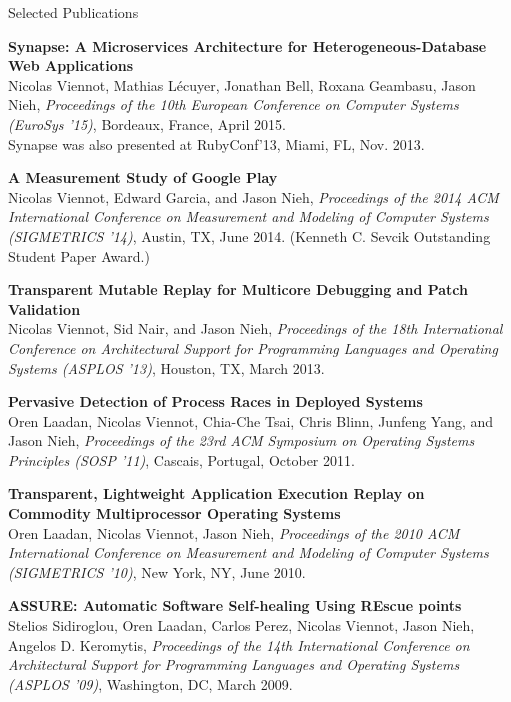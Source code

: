 \documentclass{resume} %
\begin{document}
\begin{rSection}{Selected Publications}
\begin{list}{.}{\leftmargin=0em}
\newenvironment{pub}[5]{ {\bf #1} \\ #2, {\em #3 (#4)}, #5}

\item \pub{Synapse: A Microservices Architecture for Heterogeneous-Database Web Applications}
{Nicolas Viennot, Mathias L\'{e}cuyer, Jonathan Bell, Roxana Geambasu, Jason Nieh}
{Proceedings of the 10th European Conference on Computer Systems}
{EuroSys '15}{Bordeaux, France, April 2015.}\\
Synapse was also presented at RubyConf'13, Miami, FL, Nov. 2013.

\item \pub{A Measurement Study of Google Play}
{Nicolas Viennot, Edward Garcia, and Jason Nieh}
{Proceedings of the 2014 ACM International Conference on Measurement and Modeling of Computer Systems}
{SIGMETRICS '14}{Austin, TX, June 2014. (Kenneth C. Sevcik Outstanding Student Paper Award.)}


\item \pub{Transparent Mutable Replay for Multicore Debugging and Patch Validation}
{Nicolas Viennot, Sid Nair, and Jason Nieh}
{Proceedings of the 18th International Conference on Architectural Support for Programming Languages and Operating Systems}
{ASPLOS '13}{Houston, TX, March 2013.}

\item \pub{Pervasive Detection of Process Races in Deployed Systems}
{Oren Laadan, Nicolas Viennot, Chia-Che Tsai, Chris Blinn, Junfeng Yang, and Jason Nieh}
{Proceedings of the 23rd ACM Symposium on Operating Systems Principles}
{SOSP '11}{Cascais, Portugal, October 2011.}

\item \pub{Transparent, Lightweight Application Execution Replay on Commodity Multiprocessor Operating Systems}
{Oren Laadan, Nicolas Viennot, Jason Nieh}
{Proceedings of the 2010 ACM International Conference on Measurement and Modeling of Computer Systems}
{SIGMETRICS '10}{New York, NY, June 2010.}

\item \pub{ASSURE: Automatic Software Self-healing Using REscue points}
{Stelios Sidiroglou, Oren Laadan, Carlos Perez, Nicolas Viennot, Jason Nieh, Angelos D. Keromytis}
{Proceedings of the 14th International Conference on Architectural Support for Programming Languages and Operating Systems}
{ASPLOS '09}{Washington, DC, March 2009.}

\end{list}
\end{rSection}
\end{document}
